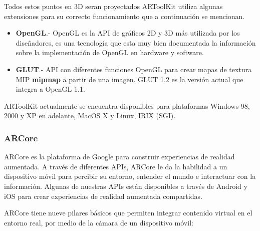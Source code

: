 Todos estos puntos en 3D seran proyectados 
\newpage
ARToolKit utiliza algunas extensiones para su correcto funcionamiento que a continuación se mencionan.
\begin{itemize}
	\item \textbf{OpenGL}.- OpenGL es la API de gráficos 2D y 3D más  utilizada por los diseñadores, es una tecnología que esta muy bien documentada la información sobre la implementación de OpenGL en hardware y software.\cite{B14}
	
	\item \textbf{GLUT}.- API con diferentes funciones OpenGL para crear mapas de textura MIP \textbf{mipmap} a partir de una imagen. GLUT 1.2 es la versión actual que integra a OpenGL 1.1.\cite{B19}
	
\end{itemize}
\noindent
ARToolKit actualmente se encuentra disponibles para plataformas Windows 98, 2000 y XP en adelante, MacOS X y Linux, IRIX (SGI).\cite{B19}
\newpage
\noindent

\subsubsection{ARCore}
ARCore es la plataforma de Google para construir experiencias de realidad aumentada. A través de diferentes APIs, ARCore le da la habilidad a un dispositivo móvil para percibir su entorno, entender el mundo e interactuar con la información. Algunas de nuestras APIs están disponibles a través de Android y iOS para crear experiencias de realidad aumentada compartidas.\par
ARCore tiene nueve pilares básicos que permiten integrar contenido virtual en el entorno real, por medio de la cámara de un dispositivo móvil:

